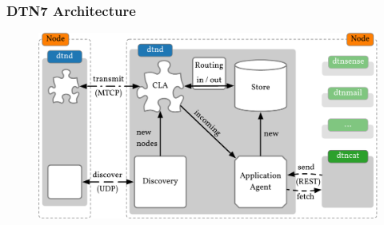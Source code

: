 \begin{frame}
  \frametitle{DTN7 Architecture}

  \begin{figure}
    \includegraphics[width=\linewidth,keepaspectratio]{include/dtn7-architecture}
  \end{figure}
\end{frame}
